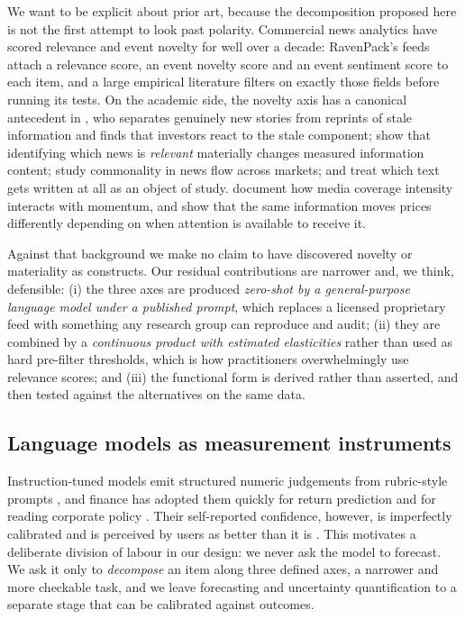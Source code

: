 We want to be explicit about prior art, because the decomposition proposed here
is not the first attempt to look past polarity. Commercial news analytics have
scored relevance and event novelty for well over a decade: RavenPack's feeds
attach a relevance score, an event novelty score and an event sentiment score to
each item, and a large empirical literature filters on exactly those fields
before running its tests. On the academic side, the novelty axis has a canonical
antecedent in \citet{tetlock2011}, who separates genuinely new stories from
reprints of stale information and finds that investors react to the stale
component; \citet{boudoukh2019} show that identifying which news is
\emph{relevant} materially changes measured information content;
\citet{dang2015} study commonality in news flow across markets; and
\citet{kelly2021} treat which text gets written at all as an object of study.
\citet{hillert2014} document how media coverage intensity interacts with
momentum, and \citet{dellavigna2009} show that the same information moves prices
differently depending on when attention is available to receive it.

Against that background we make no claim to have discovered novelty or
materiality as constructs. Our residual contributions are narrower and, we think,
defensible: (i) the three axes are produced \emph{zero-shot by a general-purpose
language model under a published prompt}, which replaces a licensed proprietary
feed with something any research group can reproduce and audit; (ii) they are
combined by a \emph{continuous product with estimated elasticities} rather than
used as hard pre-filter thresholds, which is how practitioners overwhelmingly use
relevance scores; and (iii) the functional form is derived rather than asserted,
and then tested against the alternatives on the same data.

\subsection{Language models as measurement instruments}

Instruction-tuned models emit structured numeric judgements from rubric-style
prompts \citep{brown2020}, and finance has adopted them quickly for return
prediction \citep{lopezlira2025} and for reading corporate policy
\citep{jha2024}. Their self-reported confidence, however, is imperfectly
calibrated and is perceived by users as better than it is \citep{steyvers2025}.
This motivates a deliberate division of labour in our design: we never ask the
model to forecast. We ask it only to \emph{decompose} an item along three
defined axes, a narrower and more checkable task, and we leave forecasting and
uncertainty quantification to a separate stage that can be calibrated against
outcomes.

